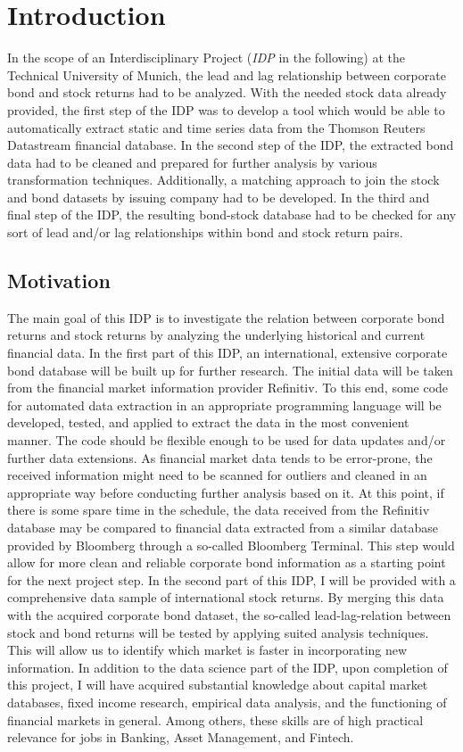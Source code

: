 \chapter{Introduction} \label{chapter:Introduction}
In the scope of an Interdisciplinary Project (\textit{IDP} in the following) at the Technical University of Munich, the lead and lag relationship between corporate bond and stock returns had to be analyzed. With the needed stock data already provided, the first step of the IDP was to develop a tool which would be able to automatically extract static and time series data from the Thomson Reuters Datastream financial database. In the second step of the IDP, the extracted bond data had to be cleaned and prepared for further analysis by various transformation techniques. Additionally, a matching approach to join the stock and bond datasets by issuing company had to be developed. In the third and final step of the IDP, the resulting bond-stock database had to be checked for any sort of lead and/or lag relationships within bond and stock return pairs. 
 
\section{Motivation}
The main goal of this IDP is to investigate the relation between corporate bond returns and stock returns by analyzing the underlying historical and current financial data.
In the first part of this IDP, an international, extensive corporate bond database will be built up for further research. The initial data will be taken from the financial market information provider Refinitiv. To this end, some code for automated data extraction in an appropriate programming language will be developed, tested, and applied to extract the data in the most convenient manner. The code should be flexible enough to be used for data updates and/or further data extensions. As financial market data tends to be error-prone, the received information might need to be scanned for outliers and cleaned in an appropriate way before conducting further analysis based on it.
At this point, if there is some spare time in the schedule, the data received from the Refinitiv database may be compared to financial data extracted from a similar database provided by Bloomberg through a so-called Bloomberg Terminal. This step would allow for more clean and reliable corporate bond information as a starting point for the next project step.
In the second part of this IDP, I will be provided with a comprehensive data sample of international stock returns. By merging this data with the acquired corporate bond dataset, the so-called lead-lag-relation between stock and bond returns will be tested by applying suited analysis techniques. This will allow us to identify which market is faster in incorporating new information.
In addition to the data science part of the IDP, upon completion of this project, I will have acquired substantial knowledge about capital market databases, fixed income research, empirical data analysis, and the functioning of financial markets in general.
Among others, these skills are of high practical relevance for jobs in Banking, Asset Management, and Fintech.

